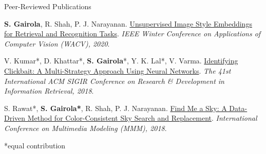 \documentclass{resume} %
\renewcommand{\thefootnote}{\alph{footnote}}
\newcommand{\astfootnote}[1]{%
\let\oldthefootnote=\thefootnote%
\setcounter{footnote}{0}%
\renewcommand{\thefootnote}{\fnsymbol{footnote}}%
\footnote{#1}%
\let\thefootnote=\oldthefootnote%
}
\begin{document}
\begin{rSection}{Peer-Reviewed Publications}
\vspace{4pt}
\item[(3.)] \textbf{S. Gairola}, R. Shah, P. J. Narayanan. \href{https://openaccess.thecvf.com/content_WACV_2020/papers/Gairola_Unsupervised_Image_Style_Embeddings_for_Retrieval_and_Recognition_Tasks_WACV_2020_paper.pdf}{Unsupervised Image Style Embeddings for Retrieval and Recognition Tasks}. \textit{IEEE Winter Conference on Applications of Computer Vision (WACV), 2020}. %

\vspace{4pt}
\item[(2.)] V. Kumar*, D. Khattar*, \textbf{S. Gairola}*, Y. K. Lal*, V. Varma. \href{https://arxiv.org/pdf/1710.01507.pdf}{Identifying Clickbait:  A Multi-Strategy Approach Using Neural Networks}. \textit{The 41st International ACM SIGIR Conference on Research \& Development in Information Retrieval, 2018}. %

\vspace{4pt}
\item[(1.)] S. Rawat*, \textbf{S. Gairola*}, R. Shah, P. J. Narayanan. \href{https://sidgairo18.github.io/sky.pdf}{Find Me a Sky: A Data-Driven Method for Color-Consistent Sky Search and Replacement}. \textit{International Conference on Multimedia Modeling (MMM), 2018}. %

\hfill \small{*equal contribution}
\end{rSection}

\end{document}
